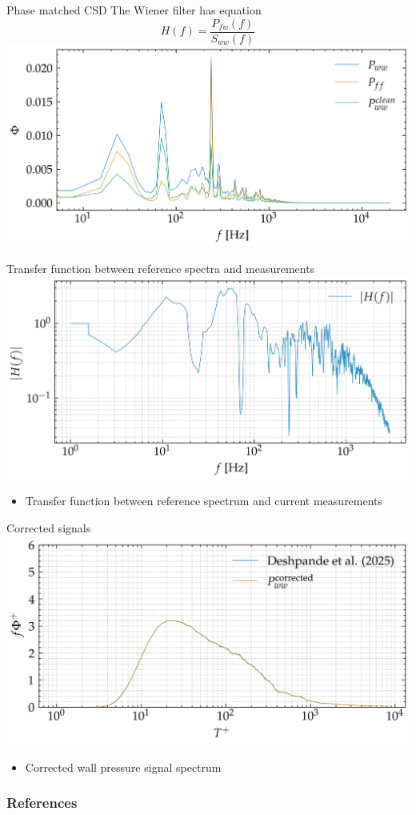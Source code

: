 \documentclass[aspectratio=169]{beamer}
\begin{document}
\begin{frame}{Phase matched CSD}
    The Wiener filter has equation
    \begin{equation}
        H(f) = \frac{P_{fw}(f)}{S_{ww}(f)}
    \end{equation}
    \centering
    \includegraphics[width=0.7\linewidth]{figures/wiener_filtered_spectrum.png}
\end{frame}


\begin{frame}{Transfer function between reference spectra and measurements}
    \centering
    \includegraphics[width=0.7\linewidth]{figures/reference_transfer_function.png}
    \begin{itemize}
        \centering
        \item Transfer function between reference spectrum \citep{deshpande_active_2025} and current measurements
    \end{itemize}
\end{frame}

\begin{frame}{Corrected signals}
    \centering
    \includegraphics[width=0.7\linewidth]{figures/final_spectrum.png}
    \begin{itemize}
        \centering
        \item Corrected wall pressure signal spectrum
    \end{itemize}
\end{frame}

\begin{frame}
    \frametitle{References}
    
    
\end{frame}
\end{document}
